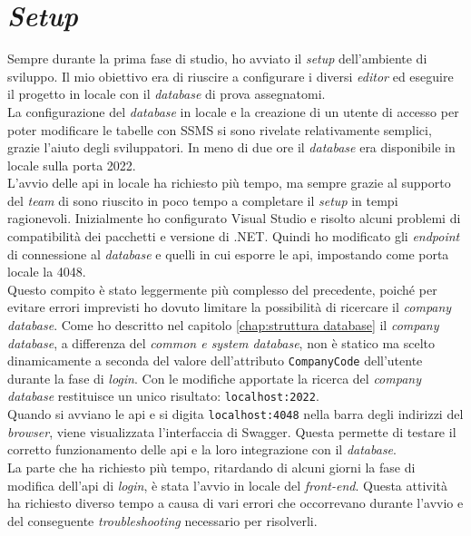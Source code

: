 \section{\textit{Setup}}
Sempre durante la prima fase di studio, ho avviato il \textit{setup} dell'ambiente di sviluppo. Il mio obiettivo era 
di riuscire a configurare i diversi \textit{editor} ed eseguire il progetto in locale con il \textit{database} di prova 
assegnatomi.\\
La configurazione del \textit{database} in locale e la creazione di un utente di accesso per poter modificare le tabelle 
con SSMS si sono rivelate relativamente semplici, grazie l'aiuto degli sviluppatori. In meno di due ore il \textit{database} 
era disponibile in locale sulla porta 2022.\\
L'avvio delle \gls{api} in locale ha richiesto più tempo, ma sempre grazie al supporto del \textit{team} di {\company} sono 
riuscito in poco tempo a completare il \textit{setup} in tempi ragionevoli.
Inizialmente ho configurato Visual Studio e risolto alcuni problemi di compatibilità dei pacchetti e versione di .NET.
Quindi ho modificato gli \textit{endpoint} di connessione al \textit{database} e quelli in cui esporre le \gls{api}, 
impostando come porta locale la 4048.\\
Questo compito è stato leggermente più complesso del precedente, poiché per evitare errori imprevisti ho dovuto limitare 
la possibilità di ricercare il \textit{company database}.
Come ho descritto nel capitolo \ref{chap:struttura database} il \textit{company database}, a differenza del \textit{common e system 
database}, non è statico ma scelto dinamicamente a seconda del valore dell'attributo \texttt{CompanyCode} dell'utente durante la 
fase di \textit{login}. Con le modifiche apportate la ricerca del \textit{company database} restituisce un unico risultato: 
\texttt{localhost:2022}.\\
Quando si avviano le \gls{api} e si digita \texttt{localhost:4048} nella barra degli indirizzi del \textit{browser}, viene 
visualizzata l'interfaccia di Swagger. Questa permette di testare il corretto funzionamento delle \gls{api} e la loro 
integrazione con il \textit{database}.\\
La parte che ha richiesto più tempo, ritardando di alcuni giorni la fase di modifica dell'\gls{api} di \textit{login}, è stata 
l'avvio in locale del \textit{front-end}. Questa attività ha richiesto diverso tempo a causa di vari errori che occorrevano 
durante l'avvio e del conseguente \textit{troubleshooting} necessario per risolverli.\\
